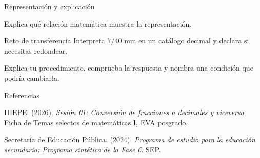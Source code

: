 \documentclass[
	spanish,
	aspectratio=1610,
	xcolor={dvipsnames,table}
]{beamer}
\begin{document}
\begin{frame}{Representación y explicación}
\centering{}\par\vspace{.15cm}\small Explica qué relación matemática muestra la representación.
\end{frame}
\begin{frame}{Reto de transferencia}
\fontsize{14}{18}\selectfont Interpreta $7/40$ mm en un catálogo decimal y declara si necesitas redondear.\par\vspace{.5cm}Explica tu procedimiento, comprueba la respuesta y nombra una condición que podría cambiarla.
\end{frame}
\begin{frame}{Referencias}
\fontsize{9}{11}\selectfont\raggedright 
{\setlength{\parskip}{6pt}
\par\hangindent=1.27cm  IIIEPE. (2026). \textit{Sesión 01: Conversión de fracciones a decimales y viceversa}. Ficha de Temas selectos de matemáticas I, EVA posgrado.
\par\hangindent=1.27cm  Secretaría de Educación Pública. (2024). \textit{Programa de estudio para la educación secundaria: Programa sintético de la Fase 6}. SEP.
}


\end{frame}
\end{document}
